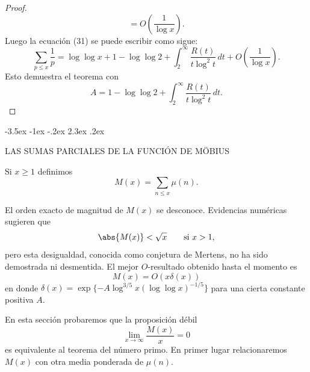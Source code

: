 \documentclass[12pt,a4paper]{book}
\makeatletter
\renewcommand\section{\@startsection{section}{1}{\z@}%
  {-3.5ex \@plus -1ex \@minus -.2ex}%
  {2.3ex \@plus .2ex}%
  {\normalfont\Large\bfseries\raggedright}}
\makeatother
\begin{document}
\begin{proof}
\begin{equation*}
            =O\left(\frac{1}{\log x}\right).
        \end{equation*}
        Luego la ecuación (31) se puede escribir como sigue:
        \begin{equation*}
            \sum_{p\leq x}\frac{1}{p}=\log\log x+1-\log\log2+\int_{2}^{\infty}\frac{R(t)}{t\log^{2}t}\,dt
            +O\left(\frac{1}{\log x}\right).
        \end{equation*}
        Esto demuestra el teorema con
        \begin{equation*}
            A=1-\log\log2+\int_{2}^{\infty}\frac{R(t)}{t\log^{2}t}\,dt.
        \end{equation*}
    \end{proof}

    \section{LAS SUMAS PARCIALES DE LA FUNCIÓN DE MÖBIUS}\label{sim:M}
    \begin{definicion}
        Si $x\geq1$ definimos
        \begin{equation*}
            M(x)=\sum_{n\leq x}\mu(n).
        \end{equation*}
    \end{definicion}

    El orden exacto de magnitud de $M(x)$ se desconoce. Evidencias numéricas sugieren
    que
    \begin{equation*}
        \abs{M(x)}<\sqrt{x}\qquad\text{si } x>1,
    \end{equation*}
    pero esta desigualdad, conocida como conjetura de Mertens, no ha sido demostrada
    ni desmentida. El mejor $O$-resultado obtenido hasta el momento es
    \begin{equation*}
        M(x)=O(x\delta(x))
    \end{equation*}
    en donde $\delta(x)=\exp\{-A\log^{3/5}x(\log\log x)^{-1/5}\}$ para una cierta
    constante positiva $A$.

    En esta sección probaremos que la proposición débil
    \begin{equation*}
        \lim_{x\to\infty}\frac{M(x)}{x}=0
    \end{equation*}
    es equivalente al teorema del número primo. En primer lugar relacionaremos $M(x)$
    con otra media ponderada de $\mu(n)$.
\end{document}
